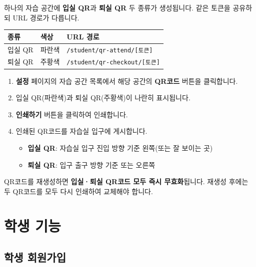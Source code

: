 \documentclass[a4paper,12pt]{article}
\newcommand{\menu}[1]{\textcolor{primary}{\textbf{#1}}}
\begin{document}
하나의 자습 공간에 \textbf{입실 QR}과 \textbf{퇴실 QR} 두 종류가 생성됩니다.
같은 토큰을 공유하되 URL 경로가 다릅니다.

\begin{center}
\begin{tabular}{lll}
\toprule
\textbf{종류} & \textbf{색상} & \textbf{URL 경로} \\
\midrule
입실 QR & 파란색 & \texttt{/student/qr-attend/[토큰]} \\
퇴실 QR & 주황색 & \texttt{/student/qr-checkout/[토큰]} \\
\bottomrule
\end{tabular}
\end{center}

\begin{enumerate}[leftmargin=1.5em]
    \item \menu{설정} 페이지의 자습 공간 목록에서 해당 공간의 \menu{QR코드} 버튼을 클릭합니다.
    \item 입실 QR(파란색)과 퇴실 QR(주황색)이 나란히 표시됩니다.
    \item \menu{인쇄하기} 버튼을 클릭하여 인쇄합니다.
    \item 인쇄된 QR코드를 자습실 입구에 게시합니다.
    \begin{itemize}
        \item \textbf{입실 QR}: 자습실 입구 진입 방향 기준 왼쪽(또는 잘 보이는 곳)
        \item \textbf{퇴실 QR}: 입구 출구 방향 기준 또는 오른쪽
    \end{itemize}
\end{enumerate}

\begin{notebox}
  QR코드를 재생성하면 \textbf{입실·퇴실 QR코드 모두 즉시 무효화}됩니다.
  재생성 후에는 두 QR코드를 모두 다시 인쇄하여 교체해야 합니다.
\end{notebox}

\section{학생 기능}

\subsection{학생 회원가입}
\end{document}
